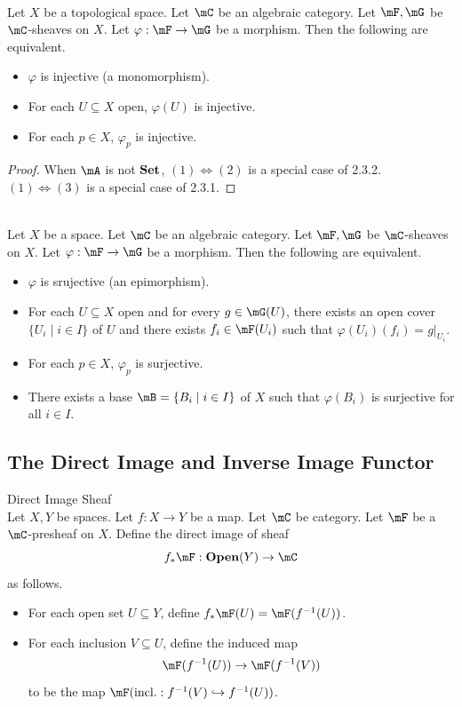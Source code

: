 \documentclass[a4paper]{article}
\begin{document}
\begin{prp}{}{}\\
Let $X$ be a topological space. Let $\mC$ be an algebraic category. Let $\mF,\mG$ be $\mC$-sheaves on $X$. Let $\varphi:\mF\to\mG$ be a morphism. Then the following are equivalent. 
\begin{itemize}
\item $\varphi$ is injective (a monomorphism). 
\item For each $U\subseteq X$ open, $\varphi(U)$ is injective. 
\item For each $p\in X$, $\varphi_p$ is injective. 
\end{itemize}
\begin{proof}
When $\mA$ is not $\bold{Set}$, $(1)\iff(2)$ is a special case of 2.3.2. $(1)\iff(3)$ is a special case of 2.3.1. 
\end{proof}
\end{prp}

\begin{prp}{}{}\\
Let $X$ be a space. Let $\mC$ be an algebraic category. Let $\mF,\mG$ be $\mC$-sheaves on $X$. Let $\varphi:\mF\to\mG$ be a morphism. Then the following are equivalent. 
\begin{itemize}
\item $\varphi$ is srujective (an epimorphism). 
\item For each $U\subseteq X$ open and for every $g\in\mG(U)$, there exists an open cover $\{U_i\;|\;i\in I\}$ of $U$ and there exists $f_i\in\mF(U_i)$ such that $\varphi(U_i)(f_i)=g|_{U_i}$. 
\item For each $p\in X$, $\varphi_p$ is surjective. 
\item There exists a base $\mB=\{B_i\;|\;i\in I\}$ of $X$ such that $\varphi(B_i)$ is surjective for all $i\in I$. 
\end{itemize}
\end{prp}

\subsection{The Direct Image and Inverse Image Functor}
\begin{defn}{Direct Image Sheaf}{}\\
Let $X,Y$ be spaces. Let $f:X\to Y$ be a map. Let $\mC$ be category. Let $\mF$ be a $\mC$-presheaf on $X$. Define the direct image of sheaf $$f_\ast\mF:\bold{Open}(Y)\to\mC$$ as follows. 
\begin{itemize}
\item For each open set $U\subseteq Y$, define $f_\ast\mF(U)=\mF(f^{-1}(U))$. 
\item For each inclusion $V\subseteq U$, define the induced map $$\mF(f^{-1}(U))\to\mF(f^{-1}(V))$$ to be the map $\mF(\text{incl.}:f^{-1}(V)\hookrightarrow f^{-1}(U))$. 
\end{itemize}
\end{defn}
\end{document}
